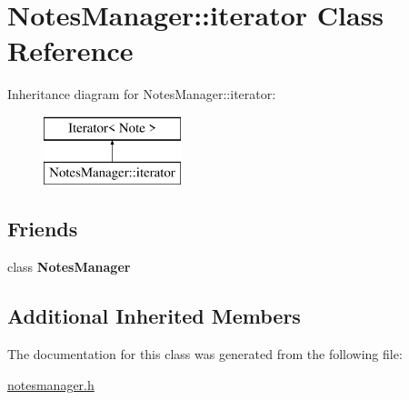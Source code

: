 \hypertarget{class_notes_manager_1_1iterator}{}\section{Notes\+Manager\+:\+:iterator Class Reference}
\label{class_notes_manager_1_1iterator}
Inheritance diagram for Notes\+Manager\+:\+:iterator\+:\begin{figure}[H]
\begin{center}
\leavevmode
\includegraphics[height=2.000000cm]{class_notes_manager_1_1iterator}
\end{center}
\end{figure}
\subsection*{Friends}
\begin{DoxyCompactItemize}
\item 
\mbox{\label{class_notes_manager_1_1iterator_a017a5144e8cfa6087305055ab968ef41}} 
class {\bfseries Notes\+Manager}
\end{DoxyCompactItemize}
\subsection*{Additional Inherited Members}


The documentation for this class was generated from the following file\+:\begin{DoxyCompactItemize}
\item 
\hyperlink{notesmanager_8h}{notesmanager.\+h}\end{DoxyCompactItemize}
